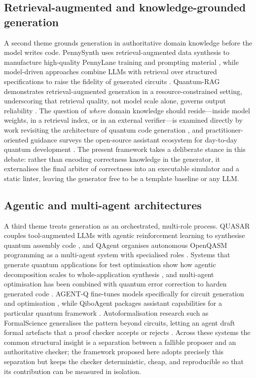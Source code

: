 \documentclass[11pt,a4paper]{article}
\begin{document}
\subsection{Retrieval-augmented and knowledge-grounded generation}
A second theme grounds generation in authoritative domain knowledge before the model writes code. PennySynth uses retrieval-augmented data synthesis to manufacture high-quality PennyLane training and prompting material \cite{ref5}, while model-driven approaches combine LLMs with retrieval over structured specifications to raise the fidelity of generated circuits \cite{ref24}. Quantum-RAG demonstrates retrieval-augmented generation in a resource-constrained setting, underscoring that retrieval quality, not model scale alone, governs output reliability \cite{ref26}. The question of \emph{where} domain knowledge should reside---inside model weights, in a retrieval index, or in an external verifier---is examined directly by work revisiting the architecture of quantum code generation \cite{ref11}, and practitioner-oriented guidance surveys the open-source assistant ecosystem for day-to-day quantum development \cite{ref12}. The present framework takes a deliberate stance in this debate: rather than encoding correctness knowledge in the generator, it externalises the final arbiter of correctness into an executable simulator and a static linter, leaving the generator free to be a template baseline or any LLM.

\subsection{Agentic and multi-agent architectures}
A third theme treats generation as an orchestrated, multi-role process. QUASAR couples tool-augmented LLMs with agentic reinforcement learning to synthesise quantum assembly code \cite{ref23}, and QAgent organises autonomous OpenQASM programming as a multi-agent system with specialised roles \cite{ref25}. Systems that generate quantum applications for test optimisation show how agentic decomposition scales to whole-application synthesis \cite{ref19}, and multi-agent optimisation has been combined with quantum error correction to harden generated code \cite{ref32}. AGENT-Q fine-tunes models specifically for circuit generation and optimisation \cite{ref33}, while QiboAgent packages assistant capabilities for a particular quantum framework \cite{ref12}. Autoformalisation research such as FormalScience generalises the pattern beyond circuits, letting an agent draft formal artefacts that a proof checker accepts or rejects \cite{ref8}. Across these systems the common structural insight is a separation between a fallible proposer and an authoritative checker; the framework proposed here adopts precisely this separation but keeps the checker deterministic, cheap, and reproducible so that its contribution can be measured in isolation.
\end{document}
